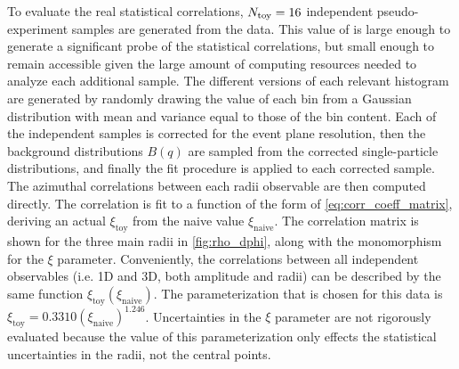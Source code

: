 To evaluate the real statistical correlations, $N_\textrm{toy} = 16$ independent pseudo-experiment samples are generated from the data.
This value of \Ntoy is large enough to generate a significant probe of the statistical correlations, but small enough to remain accessible given the large amount of computing resources needed to analyze each additional sample.
The \Ntoy different versions of each relevant histogram are generated by randomly drawing the value of each bin from a Gaussian distribution with mean and variance equal to those of the bin content.
Each of the independent \Ntoy samples is corrected for the event plane resolution, then the background distributions $B(q)$ are sampled from the corrected single-particle distributions, and finally the fit procedure is applied to each corrected sample.
The azimuthal correlations between each radii observable are then computed directly.
The correlation is fit to a function of the form of \cref{eq:corr_coeff_matrix}, deriving an actual $\xi_\textrm{toy}$ from the naive value $\xi_\textrm{naive}$.
The correlation matrix is shown for the three main radii in \cref{fig:rho_dphi}, along with the monomorphism for the $\xi$ parameter.
Conveniently, the correlations between all independent observables (i.e. 1D and 3D, both amplitude and radii) can be described by the same function $\xi_\textrm{toy}\left(\xi_\textrm{naive}\right)$.
The parameterization that is chosen for this data is $ \xi_\textrm{toy} = 0.3310 (\xi_\textrm{naive})^{1.246} $.
Uncertainties in the $\xi$ parameter are not rigorously evaluated because the value of this parameterization only effects the statistical uncertainties in the radii, not the central points.

